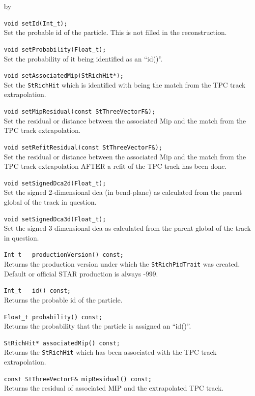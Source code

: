 \documentclass[twoside]{article}
\newcommand{\entrylabel}[1]{\mbox{\textbf{{#1}}}\hfil}%
\newenvironment{entry}
{\begin{list}{}%
    {\renewcommand{\makelabel}{\entrylabel}%
     \setlength{\labelwidth}{90pt}%
     \setlength{\leftmargin}{\labelwidth}
     \advance\leftmargin by \labelsep%
      }%
    }%
  {\end{list}}
\newcommand{\Entrylabel}[1]%
{\raisebox{0pt}[1ex][0pt]{\makebox[\labelwidth][l]%
    {\parbox[t]{\labelwidth}{\hspace{0pt}\textbf{{#1}}}}}}
\newenvironment{Entry}%
{\renewcommand{\entrylabel}{\Entrylabel}\begin{entry}}%
  {\end{entry}}
\begin{document}
\begin{Entry}
    \verb+void setId(Int_t);+\\
    Set the probable id of the particle.  This is not filled
    in the reconstruction.
    
    \verb+void setProbability(Float_t);+\\
    Set the probability of it being identified as
    an ``id()''.
    
    \verb+void setAssociatedMip(StRichHit*);+\\
    Set the \texttt{StRichHit} which is identified
    with being the match from the TPC track extrapolation.
    
    \verb+void setMipResidual(const StThreeVectorF&);+\\
    Set the residual or distance between the associated Mip and
    the match from the TPC track extrapolation.

    \verb+void setRefitResidual(const StThreeVectorF&);+\\
    Set the residual or distance between the associated Mip and
    the match from the TPC track extrapolation AFTER a
    refit of the TPC track has been done.
    
    \verb+void setSignedDca2d(Float_t);+\\
    Set the signed 2-dimensional dca (in bend-plane)
    as calculated from the parent global
    of the track in question.
    
    \verb+void setSignedDca3d(Float_t);+\\
    Set the signed 3-dimensional dca
    as calculated from the parent global
    of the track in question.

    \verb+Int_t   productionVersion() const;+\\
    Returns the production version under which
    the \texttt{StRichPidTrait} was created.
    Default or official STAR production is always
    -999.
    
    \verb+Int_t   id() const;+\\
    Returns the probable id of the particle.
    
    \verb+Float_t probability() const;+\\
    Returns the probability that the particle is
    assigned an ``id()''.

    \verb+StRichHit* associatedMip() const;+\\
    Returns the \texttt{StRichHit} which has been
    associated with the TPC track extrapolation.
    
    \verb+const StThreeVectorF& mipResidual() const;+\\
    Returns the residual of associated MIP and the
    extrapolated TPC track.
    

\end{Entry}
\end{document}

